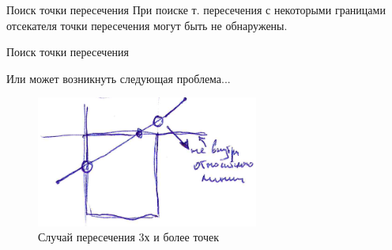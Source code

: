 \documentclass{beamer}
\begin{document}
\begin{frame}{Поиск точки пересечения}
{		При поиске т. пересечения с некоторыми границами отсекателя 
	точки пересечения могут быть не обнаружены.
		}

	\end{frame}

	\begin{frame}{Поиск точки пересечения}

		Или может возникнуть следующая проблема...
		\begin{figure} 
			\includegraphics[width=0.65\textwidth]{images/example7.png}
			\caption{Случай пересечения 3х и более точек}
		\end{figure}
		

	\end{frame}
\end{document}
